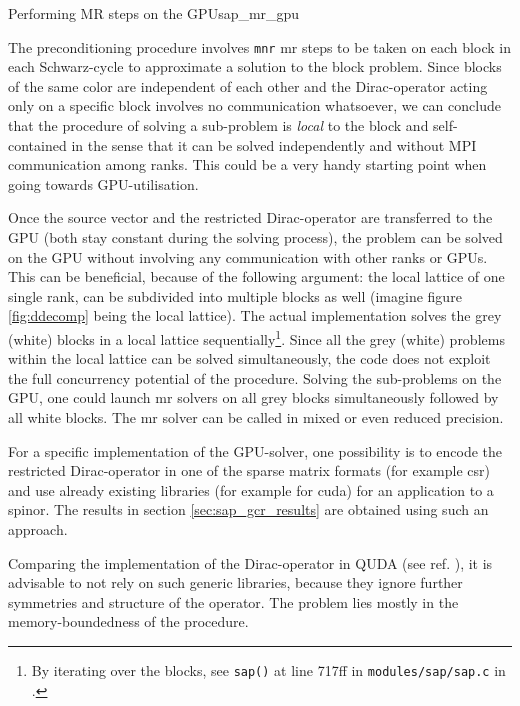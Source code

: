 \documentclass{article}
\theoremstyle{plain} %
\theoremstyle{convention} %
\theoremstyle{remark} %
\def\code#1{\texttt{#1}}
\numberwithin{equation}{section}
\begin{document}
\begin{proposal}{Performing MR steps on the GPU}{sap_mr_gpu}

The preconditioning procedure involves \code{mnr} \acrshort{mr} steps to be taken on each block in each Schwarz-cycle to approximate a solution to the block problem. Since blocks of the same color are independent of each other and the Dirac-operator acting only on a specific block involves no communication whatsoever, we can conclude that the procedure of solving a sub-problem is \textit{local} to the block and self-contained in the sense that it can be solved independently and without MPI communication among ranks. This could be a very handy starting point when going towards GPU-utilisation.

Once the source vector and the restricted Dirac-operator are transferred to the GPU (both stay constant during the solving process), the problem can be solved on the GPU without involving any communication with other ranks or GPUs. This can be beneficial, because of the following argument: the local lattice of one single rank, can be subdivided into multiple blocks as well (imagine figure \ref{fig:ddecomp} being the local lattice). The actual implementation solves the grey (white) blocks in a local lattice sequentially\footnote{By iterating over the blocks, see \code{sap()} at line \num{717}ff in \code{modules/sap/sap.c} in \cite{openqxd}.}. Since all the grey (white) problems within the local lattice can be solved simultaneously, the code does not exploit the full concurrency potential of the procedure. Solving the sub-problems on the GPU, one could launch \acrshort{mr} solvers on all grey blocks simultaneously followed by all white blocks. The \acrshort{mr} solver can be called in mixed or even reduced precision.

For a specific implementation of the GPU-solver, one possibility is to encode the restricted Dirac-operator in one of the sparse matrix formats (for example \acrshort{csr}) and use already existing libraries (for example \cite{bell2008} for \acrshort{cuda}) for an application to a spinor. The results in section \ref{sec:sap_gcr_results} are obtained using such an approach.

Comparing the implementation of the Dirac-operator in QUDA (see ref. \cite{clark2010}), it is advisable to not rely on such generic libraries, because they ignore further symmetries and structure of the operator. The problem lies mostly in the memory-boundedness of the procedure.

\end{proposal}
\end{document}
